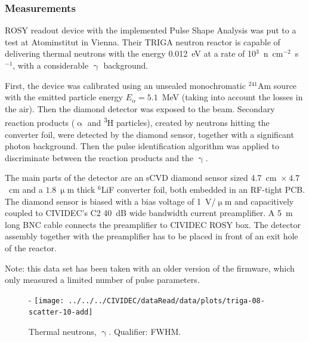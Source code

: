 \subsubsection{Measurements}
ROSY readout device with the implemented Pulse Shape Analysis was put to a test at Atominstitut in Vienna. Their TRIGA neutron reactor is capable of delivering thermal neutrons with the energy 0.012~eV at a rate of 10$^3$~n~cm$^{-2}$~s$^{-1}$, with a considerable $\upgamma$ background. 

First, the device was calibrated using an unsealed monochromatic $^{241}$Am source with the emitted particle energy $E_\alpha=5.1$~MeV (taking into account the losses in the air). Then the diamond detector was exposed to the beam. Secondary reaction products ($\upalpha$ and \textsuperscript{3}H particles), created by neutrons hitting the converter foil, were detected by the diamond sensor, together with a significant photon background. Then the pulse identification algorithm was applied to discriminate between the reaction products and the $\upgamma$.

The main parts of the detector are an sCVD diamond sensor sized 4.7~cm~$\times~4.7$~cm and a $1.8~\upmu$m thick $^6$LiF converter foil, both embedded in an RF-tight PCB. The diamond sensor is biased with a bias voltage of 1~V/$\upmu$m  and capacitively coupled to CIVIDEC's C2 40~dB wide bandwidth current preamplifier. A 5~m long BNC cable connects the preamplifier to CIVIDEC ROSY box. The detector assembly together with the preamplifier has to be placed in front of an exit hole of the reactor.

Note: this data set has been taken with an older version of the firmware, which only measured a limited number of pulse parameters.

\clearpage
\begin{figure}[]
\centering-
\texttt{[image: ../../../CIVIDEC/dataRead/data/plots/triga-08-scatter-10-add]}
\caption{Thermal neutrons, $\upgamma$. Qualifier: FWHM.}
\label{fig:scattertriga1}
\end{figure}

